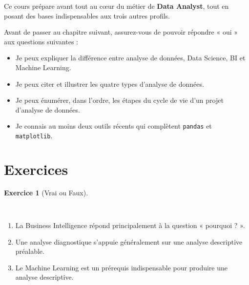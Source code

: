 \documentclass[
  french,
  letterpaper,
  open=any]{scrbook}
\providecommand{\tightlist}{%
  \setlength{\itemsep}{0pt}\setlength{\parskip}{0pt}}
\theoremstyle{definition}
\theoremstyle{definition}
\newtheorem{exercise}{Exercice}[section]
\theoremstyle{remark}
\begin{document}
Ce cours prépare avant tout au cœur du métier de \textbf{Data Analyst},
tout en posant des bases indispensables aux trois autres profils.

\begin{tcolorbox}[enhanced jigsaw, arc=.35mm, bottomrule=.15mm, bottomtitle=1mm, breakable, colback=white, colbacktitle=quarto-callout-note-color!10!white, colframe=quarto-callout-note-color-frame, coltitle=black, left=2mm, leftrule=.75mm, opacityback=0, opacitybacktitle=0.6, rightrule=.15mm, title=\textcolor{quarto-callout-note-color}{\faInfo}\hspace{0.5em}{Auto-évaluation}, titlerule=0mm, toprule=.15mm, toptitle=1mm]

Avant de passer au chapitre suivant, assurez-vous de pouvoir répondre «
oui » aux questions suivantes :

\begin{itemize}
\tightlist
\item[$\square$]
  Je peux expliquer la différence entre analyse de données, Data
  Science, BI et Machine Learning.
\item[$\square$]
  Je peux citer et illustrer les quatre types d'analyse de données.
\item[$\square$]
  Je peux énumérer, dans l'ordre, les étapes du cycle de vie d'un projet
  d'analyse de données.
\item[$\square$]
  Je connais au moins deux outils récents qui complètent \texttt{pandas}
  et \texttt{matplotlib}.
\end{itemize}

\end{tcolorbox}

\section{Exercices}\label{exercices}

\begin{exercise}[Vrai ou
Faux]\protect\hypertarget{exr-intro-ad-1}{}\label{exr-intro-ad-1}

~

\begin{enumerate}
\def\labelenumi{\alph{enumi}.}
\tightlist
\item
  La Business Intelligence répond principalement à la question «
  pourquoi ? ».
\item
  Une analyse diagnostique s'appuie généralement sur une analyse
  descriptive préalable.
\item
  Le Machine Learning est un prérequis indispensable pour produire une
  analyse descriptive.
\end{enumerate}

\end{exercise}
\end{document}
